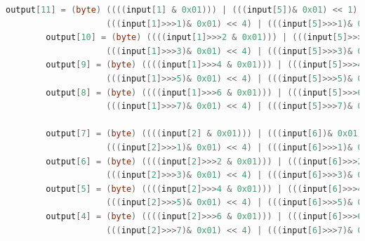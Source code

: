 \documentclass[12pt]{article} %
\begin{document}
\begin{lstlisting}[language=Java, basicstyle=\small, breaklines=true]
        output[11] = (byte) ((((input[1] & 0x01))) | (((input[5])& 0x01) << 1) | (((input[9])& 0x01) << 2) | (((input[13])& 0x01) << 3) | 
                    (((input[1]>>>1)& 0x01) << 4) | (((input[5]>>>1)& 0x01) << 5) | (((input[9]>>>1)& 0x01) << 6) | (((input[13]>>>1)& 0x01) << 7));
        output[10] = (byte) ((((input[1]>>>2 & 0x01))) | (((input[5]>>>2)& 0x01) << 1) | (((input[9]>>>2)& 0x01) << 2) | (((input[13]>>>2)& 0x01) << 3) | 
                    (((input[1]>>>3)& 0x01) << 4) | (((input[5]>>>3)& 0x01) << 5) | (((input[9]>>>3)& 0x01) << 6) | (((input[13]>>>3)& 0x01) << 7));
        output[9] = (byte) ((((input[1]>>>4 & 0x01))) | (((input[5]>>>4)& 0x01) << 1) | (((input[9]>>>4)& 0x01) << 2) | (((input[13]>>>4)& 0x01) << 3) | 
                    (((input[1]>>>5)& 0x01) << 4) | (((input[5]>>>5)& 0x01) << 5) | (((input[9]>>>5)& 0x01) << 6) | (((input[13]>>>5)& 0x01) << 7));
        output[8] = (byte) ((((input[1]>>>6 & 0x01))) | (((input[5]>>>6)& 0x01) << 1) | (((input[9]>>>6)& 0x01) << 2) | (((input[13]>>>6)& 0x01) << 3) | 
                    (((input[1]>>>7)& 0x01) << 4) | (((input[5]>>>7)& 0x01) << 5) | (((input[9]>>>7)& 0x01) << 6) | (((input[13]>>>7)& 0x01) << 7));
        
        output[7] = (byte) ((((input[2] & 0x01))) | (((input[6])& 0x01) << 1) | (((input[10])& 0x01) << 2) | (((input[14])& 0x01) << 3) | 
                    (((input[2]>>>1)& 0x01) << 4) | (((input[6]>>>1)& 0x01) << 5) | (((input[10]>>>1)& 0x01) << 6) | (((input[14]>>>1)& 0x01) << 7));
        output[6] = (byte) ((((input[2]>>>2 & 0x01))) | (((input[6]>>>2)& 0x01) << 1) | (((input[10]>>>2)& 0x01) << 2) | (((input[14]>>>2)& 0x01) << 3) | 
                    (((input[2]>>>3)& 0x01) << 4) | (((input[6]>>>3)& 0x01) << 5) | (((input[10]>>>3)& 0x01) << 6) | (((input[14]>>>3)& 0x01) << 7));
        output[5] = (byte) ((((input[2]>>>4 & 0x01))) | (((input[6]>>>4)& 0x01) << 1) | (((input[10]>>>4)& 0x01) << 2) | (((input[14]>>>4)& 0x01) << 3) | 
                    (((input[2]>>>5)& 0x01) << 4) | (((input[6]>>>5)& 0x01) << 5) | (((input[10]>>>5)& 0x01) << 6) | (((input[14]>>>5)& 0x01) << 7));
        output[4] = (byte) ((((input[2]>>>6 & 0x01))) | (((input[6]>>>6)& 0x01) << 1) | (((input[10]>>>6)& 0x01) << 2) | (((input[14]>>>6)& 0x01) << 3) | 
                    (((input[2]>>>7)& 0x01) << 4) | (((input[6]>>>7)& 0x01) << 5) | (((input[10]>>>7)& 0x01) << 6) | (((input[14]>>>7)& 0x01) << 7));


\end{lstlisting}
\end{document}
